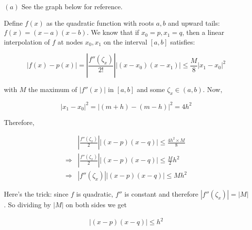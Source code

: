 \documentclass[12pt]{article}
\theoremstyle{definition}
\begin{document}
$(a)$ See the graph below for reference. 

\begin{center}
\end{center}

Define $f(x)$ as the quadratic function with roots $a, b$ and upward tails:
$f(x) = (x-a)(x-b)$. We know that if $x_0 = p, x_1 = q$, then a linear interpolation of 
$f$ at nodes $x_0, x_1$ on the interval $[a, b]$ satisfies: 

\begin{equation*}
    \left| f(x) - p(x) \right| = \left|\frac{ f''(\zeta_x) }{2!}\right|
    |(x-x_0)(x-x_1)| \leq
    \frac{M}{8}|x_1 - x_0|^2
\end{equation*}

with $M$ the maximum of $|f''(x)|$ in $[a, b]$ and some $\zeta_x \in (a, b)$. Now, 

\begin{equation*}
    \left| x_1 - x_0 \right|^2 = |(m+h)- (m-h)|^2 = 4h^2
\end{equation*}

Therefore, 

\begin{align*}
    &\left| \frac{ f''(\zeta_x) }{2} \right| \left| (x-p)(x-q) \right|  \leq \frac{4h^2\times M}{8}\\ 
    \Rightarrow&\left| \frac{ f''(\zeta_x) }{2} \right| \left| (x-p)(x-q) \right|  \leq
    \frac{M}{2}h^2\\
    \Rightarrow &\left| f''(\zeta_x) \right|  \left| (x-p)(x-q) \right| \leq Mh^2
\end{align*}

Here's the trick: since $f$ is quadratic, $f''$ is constant and therefore
$\left| f''(\zeta_x) \right| = |M|$. So dividing by $|M|$ on both sides we get

\begin{align*}
    \left| (x-p)(x-q) \right| \leq h^2
\end{align*}
\end{document}
